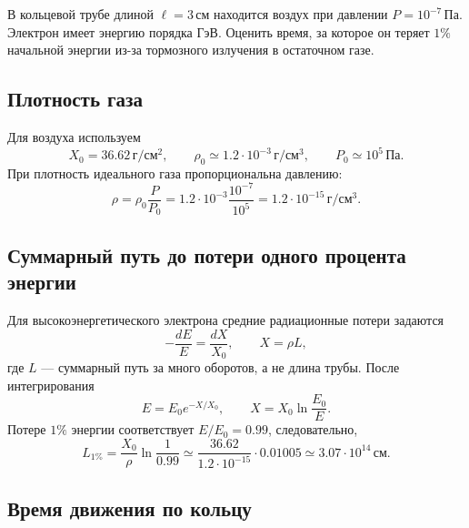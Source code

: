 \documentclass[../final.tex]{subfiles}
\begin{document}
\label{task:vacuum_losses_sem5}

\condition
В кольцевой трубе длиной $\ell=3\,\text{см}$ находится воздух при давлении
$P=10^{-7}\,\text{Па}$. Электрон имеет энергию порядка ГэВ.
Оценить время, за которое он теряет $1\%$ начальной энергии
из-за тормозного излучения в остаточном газе.

\solution
\subsection*{Плотность газа}

Для воздуха используем
\begin{equation*}
    X_0=36.62\,\text{г}/\text{см}^2,\qquad
    \rho_0\simeq1.2\cdot10^{-3}\,\text{г}/\text{см}^3,
    \qquad P_0\simeq10^5\,\text{Па}.
\end{equation*}
При  плотность идеального газа
пропорциональна давлению:
\begin{equation*}
    \rho=\rho_0\frac{P}{P_0}
    =1.2\cdot10^{-3}\frac{10^{-7}}{10^5}
    =1.2\cdot10^{-15}\,\text{г}/\text{см}^3.
\end{equation*}

\subsection*{Суммарный путь до потери одного процента энергии}

Для высокоэнергетического электрона средние радиационные потери задаются
\begin{equation*}
    -\frac{dE}{E}=\frac{dX}{X_0},\qquad X=\rho L,
\end{equation*}
где $L$ --- суммарный путь за много оборотов, а не длина трубы.
После интегрирования
\begin{equation*}
    E=E_0e^{-X/X_0},\qquad
    X=X_0\ln\frac{E_0}{E}.
\end{equation*}
Потере $1\%$ энергии соответствует $E/E_0=0.99$, следовательно,
\begin{equation*}
    L_{1\%}=\frac{X_0}{\rho}\ln\frac1{0.99}
    \simeq\frac{36.62}{1.2\cdot10^{-15}}\cdot0.01005
    \simeq3.07\cdot10^{14}\,\text{см}.
\end{equation*}

\subsection*{Время движения по кольцу}
\end{document}
